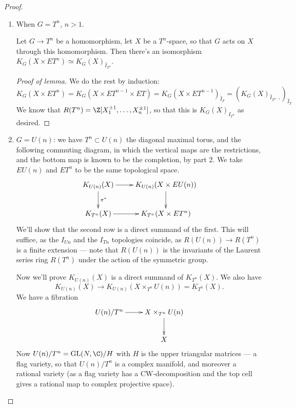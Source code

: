 \documentclass[11pt]{article}
\begin{document}
\begin{GuozhenEqKthy}
\begin{proof}
\begin{enumerate}
\begin{proof}[Proof of lemma]
In the special case $\varprojlim^1$ vanishes and the $\varprojlim$ vanishes (by finite module over noetherian ring-ness), so $K_G(X\times S^\infty)\cong \varprojlim K_G(X\times S^{2n-1})$. But the inverse limit of the third terms vanishes. [Get ML because of finiteness]
\end{proof}
\item When $G=T^n$, $n>1$.
\begin{lem*}
Let $G\to T^n$ be a homomorphism, let $X$ be a $T^n$-space, so that $G$ acts on $X$ through this homomorphism. Then there's an isomorphism $K_G(X\times ET^n)\simeq K_G(X)_{\hat I_{T^n}}$.
\end{lem*}
\begin{proof}[Proof of lemma]
We do the rest by induction:
\[K_G(X\times ET^n)=K_G(X\times ET^{n-1}\times ET)=K_G(X\times ET^{n-1})_{\hat I_T}=(K_G(X)_{\hat I_{T^{n-1}}})_{\hat I_{T}}\]
We know that $R(T^n)=\Z[X_1^{\pm1},\ldots,X_n^{\pm1}]$, so that
this is $K_G(X)_{I_{T^n}}$ as desired.
\end{proof}
\item $G=U(n)$: we have $T^n\subset U(n)$ the diagonal maximal torus, and the following commuting diagram, in which the vertical maps are the restrictions, and the bottom map is known to be the completion, by part 2. We take $EU(n)$ and $ET^n$ to be the same topological space.
\[\xymatrix{
K_{U(n)}(X)\ar[r]\ar[d]^{\pi^*}& K_{U(n)}(X\times EU(n))\ar[d]\\
\ar[r]K_{T^n}(X)&K_{T^n}(X\times ET^n)
}\]
We'll show that the second row is a direct summand of the first. This will suffice, as the $I_{Un}$ and the $I_{Tn}$ topologies coincide, as $R(U(n))\to R(T^n)$ is a finite extension --- note that $R(U(n))$ is the invariants of the Laurent series ring $R(T^n)$ under the action of the symmetric group.

Now we'll prove $K_{U(n)}(X)$ is a direct summand of $K_{T^n}(X)$. We also have
\[K_{U(n)}(X)\to K_{U(n)}(X\times_{T^n} U(n))=K_{T^n}(X).\]  
We have a fibration
\[\xymatrix{U(n)/T^n\ar[r]& X\times_{T^n}U(n)\ar[d]\\
&X}\]
Now $U(n)/T^n=\GL(N,\C)/H$ with $H$ is the upper triangular matrices --- a flag variety, so that $U(n)/T^n$ is a complex manifold, and moreover a rational variety (as a flag variety has a CW-decomposition and the top cell gives a rational map to complex projective space).



\end{enumerate}
\end{proof}
\end{GuozhenEqKthy}
\end{document}
